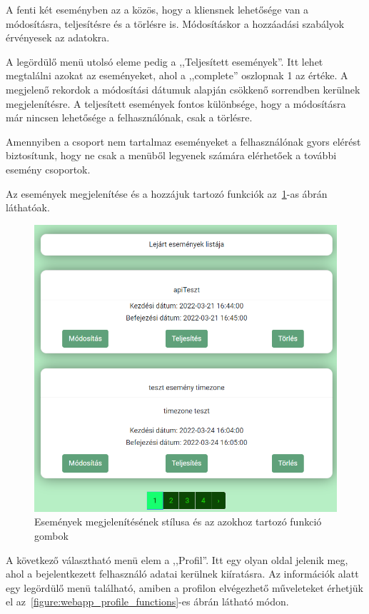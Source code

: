 \documentclass[
]{thesis-ekf}
\theoremstyle{definition}
\theoremstyle{remark}
\begin{document}
	A fenti két eseményben az a közös, hogy a kliensnek lehetősége van a módosításra, teljesítésre és a törlésre is. Módosításkor a hozzáadási szabályok érvényesek az adatokra.
	
	A legördülő menü utolsó eleme pedig a ,,Teljesített események''. Itt lehet megtalálni azokat az eseményeket, ahol a ,,complete'' oszlopnak 1 az értéke. A megjelenő rekordok a módosítási dátumuk alapján csökkenő sorrendben kerülnek megjelenítésre. A teljesített események fontos különbsége, hogy a módosításra már nincsen lehetősége a felhasználónak, csak a törlésre.
	
	Amennyiben a csoport nem tartalmaz eseményeket a felhasználónak gyors elérést biztosítunk, hogy ne csak a menüből legyenek számára elérhetőek a további esemény csoportok.
	
	Az események megjelenítése és a hozzájuk tartozó funkciók az~\ref{figure:webapp_event_list_functions}-as ábrán láthatóak.
	
	\begin{figure}[ht!]
		\centering
		\includegraphics[width=1\textwidth]{web_app/web_events_list_and_functions}
		\caption{Események megjelenítésének stílusa és az azokhoz tartozó funkció gombok}
		\label{figure:webapp_event_list_functions}
	\end{figure}
	
	A következő választható menü elem a ,,Profil''. Itt egy olyan oldal jelenik meg, ahol a bejelentkezett felhasználó adatai kerülnek kiíratásra. Az információk alatt egy legördülő menü található, amiben a profilon elvégezhető műveleteket érhetjük el az~\ref{figure:webapp_profile_functions}-es ábrán látható módon.
	
\end{document}
